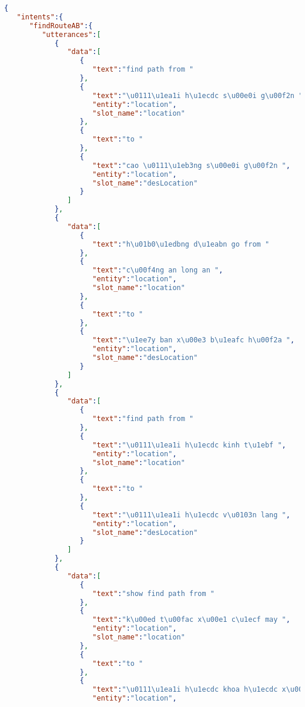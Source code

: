 \begin{lstlisting}[language=json,firstnumber=1]
{
   "intents":{
      "findRouteAB":{
         "utterances":[
            {
               "data":[
                  {
                     "text":"find path from "
                  },
                  {
                     "text":"\u0111\u1ea1i h\u1ecdc s\u00e0i g\u00f2n ",
                     "entity":"location",
                     "slot_name":"location"
                  },
                  {
                     "text":"to "
                  },
                  {
                     "text":"cao \u0111\u1eb3ng s\u00e0i g\u00f2n ",
                     "entity":"location",
                     "slot_name":"desLocation"
                  }
               ]
            },
            {
               "data":[
                  {
                     "text":"h\u01b0\u1edbng d\u1eabn go from "
                  },
                  {
                     "text":"c\u00f4ng an long an ",
                     "entity":"location",
                     "slot_name":"location"
                  },
                  {
                     "text":"to "
                  },
                  {
                     "text":"\u1ee7y ban x\u00e3 b\u1eafc h\u00f2a ",
                     "entity":"location",
                     "slot_name":"desLocation"
                  }
               ]
            },
            {
               "data":[
                  {
                     "text":"find path from "
                  },
                  {
                     "text":"\u0111\u1ea1i h\u1ecdc kinh t\u1ebf ",
                     "entity":"location",
                     "slot_name":"location"
                  },
                  {
                     "text":"to "
                  },
                  {
                     "text":"\u0111\u1ea1i h\u1ecdc v\u0103n lang ",
                     "entity":"location",
                     "slot_name":"desLocation"
                  }
               ]
            },
            {
               "data":[
                  {
                     "text":"show find path from "
                  },
                  {
                     "text":"k\u00ed t\u00fac x\u00e1 c\u1ecf may ",
                     "entity":"location",
                     "slot_name":"location"
                  },
                  {
                     "text":"to "
                  },
                  {
                     "text":"\u0111\u1ea1i h\u1ecdc khoa h\u1ecdc x\u00e3 h\u1ed9i v\u00e0 nh\u00e2n v\u0103n ",
                     "entity":"location",

\end{lstlisting}
